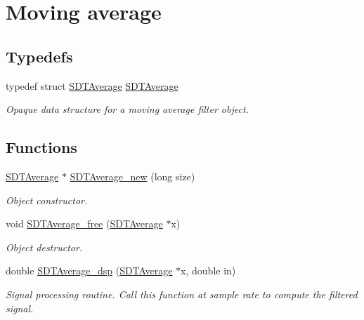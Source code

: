 \hypertarget{group__average}{}\section{Moving average}
\label{group__average}
\subsection*{Typedefs}
\begin{DoxyCompactItemize}
\item 
\hypertarget{group__average_ga59d09dcb18c4d483a1577d87ad90d1c3}{}typedef struct \hyperlink{group__average_ga59d09dcb18c4d483a1577d87ad90d1c3}{S\+D\+T\+Average} \hyperlink{group__average_ga59d09dcb18c4d483a1577d87ad90d1c3}{S\+D\+T\+Average}\label{group__average_ga59d09dcb18c4d483a1577d87ad90d1c3}

\begin{DoxyCompactList}\small\item\em Opaque data structure for a moving average filter object. \end{DoxyCompactList}\end{DoxyCompactItemize}
\subsection*{Functions}
\begin{DoxyCompactItemize}
\item 
\hyperlink{group__average_ga59d09dcb18c4d483a1577d87ad90d1c3}{S\+D\+T\+Average} $\ast$ \hyperlink{group__average_ga561a3d79fca7959e8e185a323beb2551}{S\+D\+T\+Average\+\_\+new} (long size)
\begin{DoxyCompactList}\small\item\em Object constructor. \end{DoxyCompactList}\item 
void \hyperlink{group__average_ga53871e87b5c502963e39f29cab8bb8cd}{S\+D\+T\+Average\+\_\+free} (\hyperlink{group__average_ga59d09dcb18c4d483a1577d87ad90d1c3}{S\+D\+T\+Average} $\ast$x)
\begin{DoxyCompactList}\small\item\em Object destructor. \end{DoxyCompactList}\item 
double \hyperlink{group__average_gae1164660f6d50d9f193b6e7dad522961}{S\+D\+T\+Average\+\_\+dsp} (\hyperlink{group__average_ga59d09dcb18c4d483a1577d87ad90d1c3}{S\+D\+T\+Average} $\ast$x, double in)
\begin{DoxyCompactList}\small\item\em Signal processing routine. Call this function at sample rate to compute the filtered signal. \end{DoxyCompactList}\end{DoxyCompactItemize}



